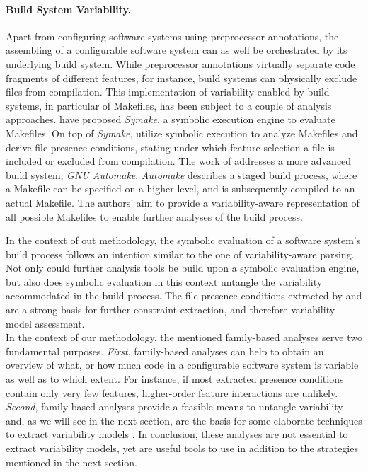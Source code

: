\paragraph{Build System Variability.} Apart from
configuring software systems using preprocessor annotations, the assembling of
a configurable software system can as well be orchestrated by its underlying
build system. While preprocessor annotations virtually separate code fragments
of different features, for instance, build systems can physically exclude files
from compilation. This implementation of variability enabled by build systems,
in particular of Makefiles, has been subject to a couple of analysis approaches.
\cite{tamrawi_build_2012} have proposed \emph{Symake}, a symbolic execution
engine to evaluate Makefiles.
On top of \emph{Symake}, \cite{zhou_extracting_2015} utilize symbolic execution
to analyze Makefiles and derive file presence conditions, stating under which feature
selection a file is included or excluded from compilation. The work of
\cite{al-kofahi_escaping_2016} addresses a more advanced build system, \emph{GNU
Automake}. \emph{Automake} describes a staged build process, where a Makefile
can be specified on a higher level, and is subsequently compiled to an actual Makefile. The
authors’ aim to provide a variability-aware representation of all possible
Makefiles to enable further analyses of the build process.

In the context of out methodology, the symbolic evaluation of a software
system’s build process follows an intention similar to the one of
variability-aware parsing. Not only could further analysis tools be build upon
a symbolic evaluation engine, but also does symbolic evaluation in this context
untangle the variability accommodated in the build process. The file presence
conditions extracted by \cite{zhou_extracting_2015}
and \cite{al-kofahi_escaping_2016} are a strong basis for further constraint
extraction, and therefore variability model assessment.\\

In the context of our methodology, the mentioned family-based analyses serve two
fundamental purposes. \emph{First}, family-based analyses can help to obtain an
overview of what, or how much code in a configurable software system is variable
as well as to which extent.
For instance, if most extracted presence conditions contain only very few
features, higher-order feature interactions are unlikely. \emph{Second},
family-based analyses provide a feasible means to untangle variability and, as we will see in the
next section, are the basis for some elaborate techniques to extract
variability models \citep{nadi_mining_2014,nadi_where_2015}. In conclusion,
these analyses are not essential to extract variability models, yet are useful tools to use in
addition to the strategies mentioned in the next section.


